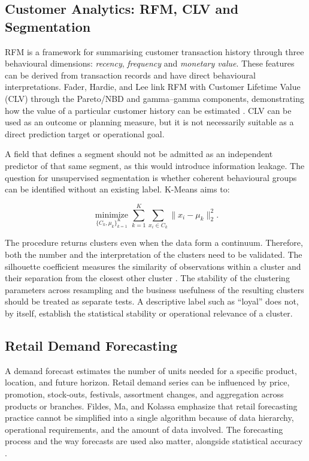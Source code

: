 \documentclass[a4paper,11pt,oneside]{book}
\theoremstyle{plain}
\theoremstyle{definition}
\theoremstyle{remark}
\begin{document}
\subsection{Customer Analytics: RFM, CLV and Segmentation}

RFM is a framework for summarising customer transaction history through
three behavioural dimensions: \emph{recency}, \emph{frequency} and
\emph{monetary value}. These features can be derived from transaction records
and have direct behavioural interpretations. Fader, Hardie, and Lee link RFM with Customer Lifetime Value (CLV) through the Pareto/NBD and gamma--gamma components, demonstrating how the value of a particular customer history can be estimated \cite{fader2005rfm}. CLV can be used as an outcome or planning measure, but it is not necessarily suitable as a direct prediction target or operational goal.

A field that defines a segment should not be admitted as an independent predictor of that same segment, as this would introduce information leakage. The question for unsupervised segmentation is whether coherent behavioural groups can be identified without an existing label. K-Means aims to:


\begin{equation}
  \underset{\{C_k,\mu_k\}_{k=1}^{K}}{\operatorname{minimize}}
  \sum_{k=1}^{K}\sum_{x_i\in C_k}\lVert x_i-\mu_k\rVert_2^2.
  \label{eq:kmeans}
\end{equation}

The procedure returns clusters even when the data form a continuum. Therefore, both the number and the interpretation of the clusters need to be validated. The silhouette coefficient measures the similarity of observations within a cluster and their separation from the closest other cluster \cite{rousseeuw1987silhouettes}. The stability of the clustering parameters across resampling and the business usefulness of the resulting clusters should be treated as separate tests. A descriptive label such as ``loyal'' does not, by itself, establish the statistical stability or operational relevance of a cluster.


\subsection{Retail Demand Forecasting}

A demand forecast estimates the number of units needed for a specific product, location, and future horizon. Retail demand series can be influenced by price, promotion, stock-outs, festivals, assortment changes, and aggregation across products or branches. Fildes, Ma, and Kolassa emphasize that retail forecasting practice cannot be simplified into a single algorithm because of data hierarchy, operational requirements, and the amount of data involved. The forecasting process and the way forecasts are used also matter, alongside statistical accuracy \cite{fildes2022retail}.
\end{document}
